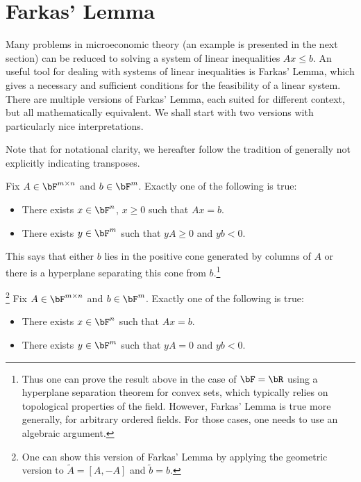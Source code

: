 \chapter{Farkas' Lemma}\label{chap:farkas}

Many problems in microeconomic theory (an example is presented in the next section) can be reduced to solving a system of linear inequalities \(Ax \leq b\).
An useful tool for dealing with systems of linear inequalities is Farkas' Lemma, which gives a necessary and sufficient conditions for the feasibility of a linear system.
There are multiple versions of Farkas' Lemma, each suited for different context, but all mathematically equivalent.
We shall start with two versions with particularly nice interpretations.

Note that for notational clarity, we hereafter follow the tradition of generally not explicitly indicating transposes.

\begin{lemma}\label{lem:farkas-geom}
  Fix \(A \in \bF^{m \times n}\) and \(b \in \bF^m\).
  Exactly one of the following is true:
  \begin{itemize}
    \item There exists \(x \in \bF^n\), \(x \geq 0\) such that \(Ax = b\).
    \item There exists \(y \in \bF^m\) such that \(yA \geq 0\) and \(y b < 0\).
  \end{itemize}
\end{lemma}

This says that either \(b\) lies in the positive cone generated by columns of \(A\) or there is a hyperplane separating this cone from \(b\).\footnote{
  Thus one can prove the result above in the case of \(\bF = \bR\) using a hyperplane separation theorem for convex sets, which typically relies on topological properties of the field.
  However, Farkas' Lemma is true more generally, for arbitrary ordered fields.
  For those cases, one needs to use an algebraic argument.
}

\begin{lemma}\label{lem:farkas-alg}\footnote{
One can show this version of Farkas' Lemma by applying the geometric version to \(\tilde{A} = [A, -A]\) and \(\tilde{b} = b\).
}
  Fix \(A \in \bF^{m \times n}\) and \(b \in \bF^m\).
  Exactly one of the following is true:
  \begin{itemize}
    \item There exists \(x \in \bF^n\) such that \(Ax = b\).
    \item There exists \(y \in \bF^m\) such that \(yA = 0\) and \(y b < 0\).
  \end{itemize}
\end{lemma}

